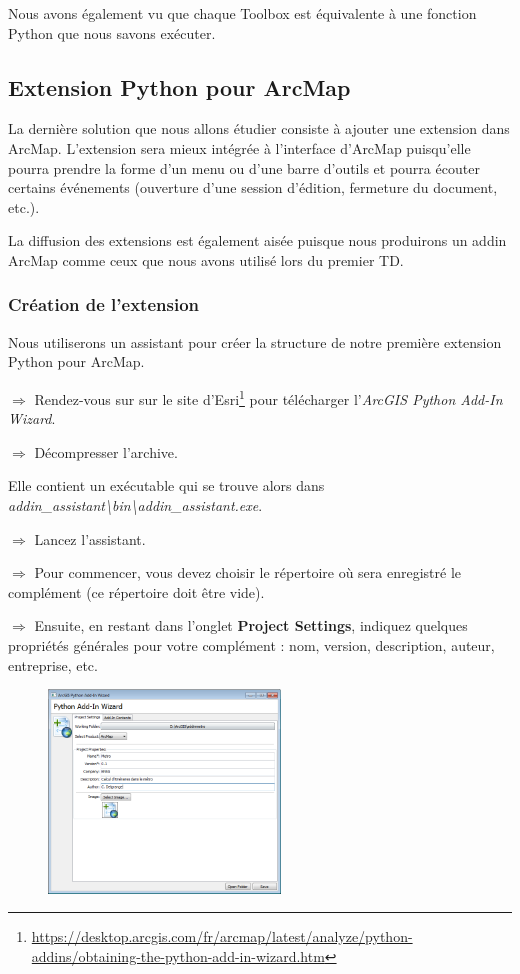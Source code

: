 \documentclass[11pt]{article}
\newcommand{\action}{$\Rightarrow$ }
\begin{document}
Nous avons également vu que chaque Toolbox est équivalente à une fonction Python que nous savons exécuter.


\subsection{Extension Python pour ArcMap}
La dernière solution que nous allons étudier consiste à ajouter une extension dans ArcMap.
L'extension sera mieux intégrée à l'interface d'ArcMap puisqu'elle pourra prendre la forme d'un menu ou d'une barre d'outils et pourra écouter certains événements (ouverture d'une session d'édition, fermeture du document, etc.).

La diffusion des extensions est également aisée puisque nous produirons un addin ArcMap comme ceux que nous avons utilisé lors du premier TD.

\subsubsection{Création de l'extension}
Nous utiliserons un assistant pour créer la structure de notre première extension Python pour ArcMap.

\action Rendez-vous sur sur le site d'Esri\footnote{\url{https://desktop.arcgis.com/fr/arcmap/latest/analyze/python-addins/obtaining-the-python-add-in-wizard.htm}} pour télécharger l'\textit{ArcGIS Python Add-In Wizard}.

\action Décompresser l'archive.

Elle contient un exécutable qui se trouve alors dans \textit{addin\_assistant\textbackslash{}bin\textbackslash{}addin\_assistant.exe}.

\action Lancez l'assistant.

\action Pour commencer, vous devez choisir le répertoire où sera enregistré le complément (ce répertoire doit être vide).

\action Ensuite, en restant dans l'onglet \textbf{Project Settings}, indiquez quelques propriétés générales pour votre complément : nom, version, description, auteur, entreprise, etc.
\begin{figure}[H]
	\center \includegraphics[width=0.55\textwidth]{img/td3/addin_assistant-1.png} \\
\end{figure}
\end{document}
